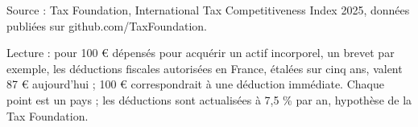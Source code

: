 Source : Tax Foundation, International Tax Competitiveness Index 2025, données publiées sur github.com/TaxFoundation.\par Lecture : pour 100 \euro{} dépensés pour acquérir un actif incorporel, un brevet par exemple, les déductions fiscales autorisées en France, étalées sur cinq ans, valent 87 \euro{} aujourd'hui ; 100 \euro{} correspondrait à une déduction immédiate. Chaque point est un pays ; les déductions sont actualisées à 7,5 \% par an, hypothèse de la Tax Foundation.
